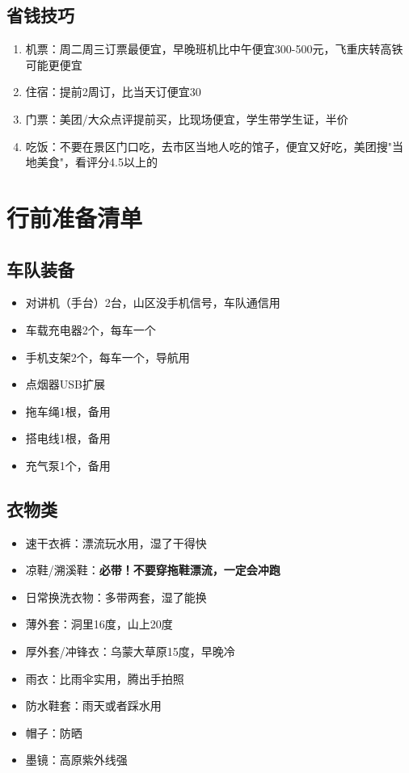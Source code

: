 \documentclass[12pt,a4paper,UTF8]{ctexart}
\begin{document}
\subsection{省钱技巧}
\begin{enumerate}
\item 机票：周二周三订票最便宜，早晚班机比中午便宜300-500元，飞重庆转高铁可能更便宜
\item 住宿：提前2周订，比当天订便宜30%
\item 门票：美团/大众点评提前买，比现场便宜，学生带学生证，半价
\item 吃饭：不要在景区门口吃，去市区当地人吃的馆子，便宜又好吃，美团搜"当地美食"，看评分4.5以上的
\end{enumerate}

\newpage

\section{行前准备清单}

\subsection{车队装备}
\begin{itemize}
\item 对讲机（手台）2台，山区没手机信号，车队通信用
\item 车载充电器2个，每车一个
\item 手机支架2个，每车一个，导航用
\item 点烟器USB扩展
\item 拖车绳1根，备用
\item 搭电线1根，备用
\item 充气泵1个，备用
\end{itemize}

\subsection{衣物类}
\begin{itemize}
\item 速干衣裤：漂流玩水用，湿了干得快
\item 凉鞋/溯溪鞋：\textbf{必带！不要穿拖鞋漂流，一定会冲跑}
\item 日常换洗衣物：多带两套，湿了能换
\item 薄外套：洞里16度，山上20度
\item 厚外套/冲锋衣：乌蒙大草原15度，早晚冷
\item 雨衣：比雨伞实用，腾出手拍照
\item 防水鞋套：雨天或者踩水用
\item 帽子：防晒
\item 墨镜：高原紫外线强
\end{itemize}
\end{document}
